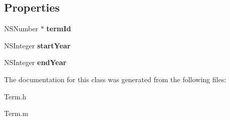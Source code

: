 \subsection*{Properties}
\begin{DoxyCompactItemize}
\item 
\hypertarget{interface_term_a1beacd986e807047abb0da06dd10e5fa}{N\+S\+Number $\ast$ {\bfseries term\+Id}}\label{interface_term_a1beacd986e807047abb0da06dd10e5fa}

\item 
\hypertarget{interface_term_a28f6215d7c7ae2f56b9fb2299ef586f8}{N\+S\+Integer {\bfseries start\+Year}}\label{interface_term_a28f6215d7c7ae2f56b9fb2299ef586f8}

\item 
\hypertarget{interface_term_a3143ae8c527f7ca31d687a60742d908b}{N\+S\+Integer {\bfseries end\+Year}}\label{interface_term_a3143ae8c527f7ca31d687a60742d908b}

\end{DoxyCompactItemize}


The documentation for this class was generated from the following files\+:\begin{DoxyCompactItemize}
\item 
Term.\+h\item 
Term.\+m\end{DoxyCompactItemize}
